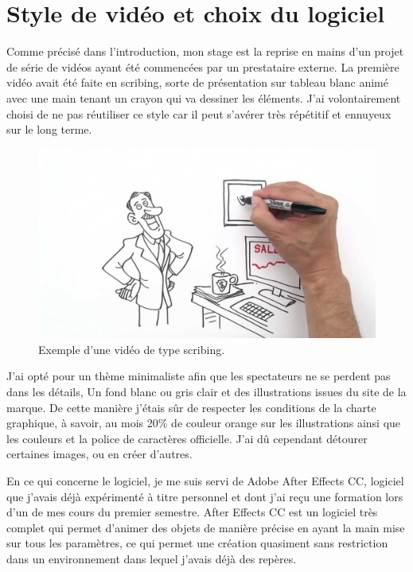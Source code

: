 \section{Style de vidéo et choix du logiciel}
Comme précisé dans l'introduction, mon stage est la reprise en mains d'un projet de série de vidéos ayant été commencées par un prestataire externe. La première vidéo avait été faite en scribing, sorte de présentation sur tableau blanc animé avec une main tenant un crayon qui va dessiner les éléments. J'ai volontairement choisi de ne pas réutiliser ce style car il peut s'avérer très répétitif et ennuyeux sur le long terme.

\begin{figure}[htp]
  \centering
  \includegraphics[width=15cm]{images/scribe}
  \caption{Exemple d'une vidéo de type scribing.}
  \label{scribe}
\end{figure}

J'ai opté pour un thème minimaliste afin que les spectateurs ne se perdent pas dans les détails, Un fond blanc ou gris clair et des illustrations issues du site de la marque. De cette manière j'étais sûr de respecter les conditions de la charte graphique, à savoir, au mois 20\% de couleur orange sur les illustrations ainsi que les couleurs et la police de caractères officielle. J'ai dû cependant détourer certaines images, ou en créer d'autres.

En ce qui concerne le logiciel, je me suis servi de Adobe After Effects CC, logiciel que j'avais déjà expérimenté à titre personnel et dont j'ai reçu une formation lors d'un de mes cours du premier semestre. After Effects CC est un logiciel très complet qui permet d'animer des objets de manière précise en ayant la main mise sur tous les paramètres, ce qui permet une création quasiment sans restriction dans un environnement dans lequel j'avais déjà des repères.


